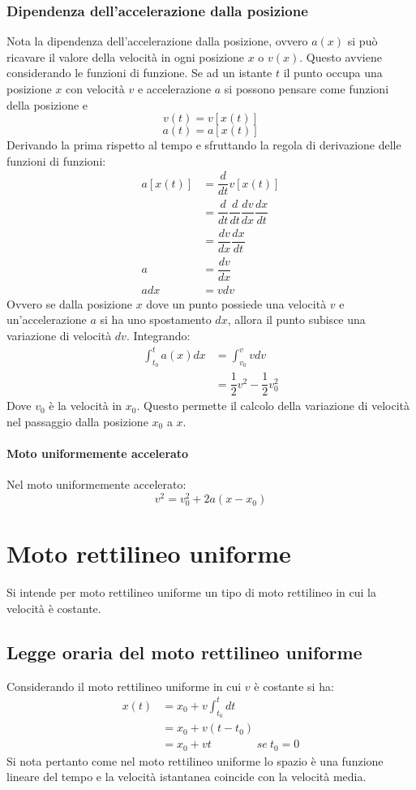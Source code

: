 \documentclass[class=book, crop=false, oneside, 12pt]{standalone}
\begin{document}
		\subsubsection{Dipendenza dell'accelerazione dalla posizione}
		Nota la dipendenza dell'accelerazione dalla posizione, ovvero $a(x)$ si pu\`o ricavare il valore della velocit\`a in ogni posizione $x$ o $v(x)$.
		Questo avviene considerando le funzioni di funzione.
		Se ad un istante $t$ il punto occupa una posizione $x$ con velocit\`a $v$ e accelerazione $a$ si possono pensare come funzioni della posizione e
		$$v(t) = v[x(t)]$$
		$$a(t) = a[x(t)]$$
		Derivando la prima rispetto al tempo e sfruttando la regola di derivazione delle funzioni di funzioni:
		\begin{align*}
			a[x(t)] &= \dfrac{d}{dt}v[x(t)]\\
			        &= \dfrac{d}{dt}\dfrac{d}{dt}\dfrac{dv}{dx}\dfrac{dx}{dt}\\
		      		&= \dfrac{dv}{dx}\dfrac{dx}{dt}\\
			a  	    &= \dfrac{dv}{dx}\\
			adx     &= vdv
		\end{align*}
		Ovvero se dalla posizione $x$ dove un punto possiede una velocit\`a $v$ e un'accelerazione $a$ si ha uno spostamento $dx$, allora il punto subisce una variazione di velocit\`a $dv$.
		Integrando:
		\begin{align*}
			\int_{t_0}^t a(x)dx &= \int_{v_0}^{v} vdv\\
		      		       &= \dfrac{1}{2}v^2 -\dfrac{1}{2}v_0^2
		\end{align*}
		Dove $v_0$ \`e la velocit\`a in $x_0$.
		Questo permette il calcolo della variazione di velocit\`a nel passaggio dalla posizione $x_0$ a $x$.
			\paragraph{Moto uniformemente accelerato}
			Nel moto uniformemente accelerato:
			$$v^2 = v_0^2 + 2a(x-x_0)$$
\section{Moto rettilineo uniforme}
Si intende per moto rettilineo uniforme un tipo di moto rettilineo in cui la velocit\`a \`e costante.
  \subsection{Legge oraria del moto rettilineo uniforme}
	Considerando il moto rettilineo uniforme in cui $v$ \`e costante si ha:
	\begin{align*}
		x(t) &= x_0 + v\int_{t_0}^t dt\\
		     &=x_0 + v(t-t_0)\\
		     &=x_0 + vt\qquad\qquad se\ t_0 = 0
	\end{align*}
	Si nota pertanto come nel moto rettilineo uniforme lo spazio \`e una funzione lineare del tempo e la velocit\`a istantanea coincide con la velocit\`a media.
\end{document}

